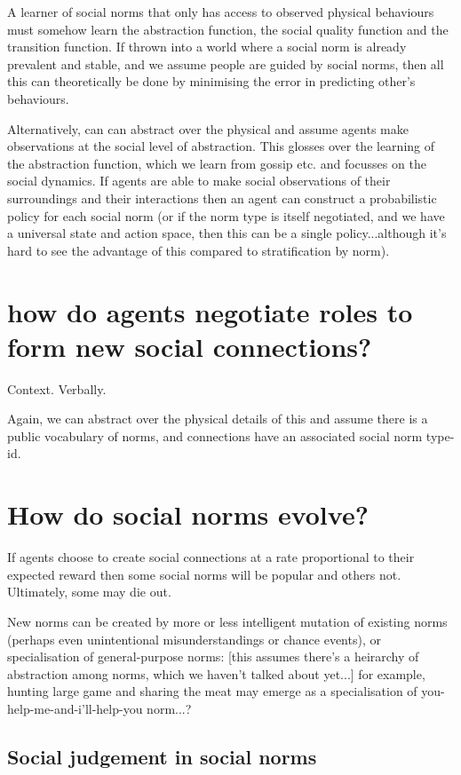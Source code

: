 \documentclass[a4paper]{article}
\begin{document}
A learner of social norms that only has access to observed physical behaviours must somehow learn the abstraction function, the social quality function and the transition function. If thrown into a world where a social norm is already prevalent and stable, and we assume people are guided by social norms, then all this can theoretically be done by minimising the error in predicting other's behaviours.

Alternatively, can can abstract over the physical and assume agents make observations at the social level of abstraction. This glosses over the learning of the abstraction function, which we learn from gossip etc. and focusses on the social dynamics. If agents are able to make social observations of their surroundings and their interactions then an agent can construct a probabilistic policy for each social norm (or if the norm type is itself negotiated, and we have a universal state and action space, then this can be a single policy...although it's hard to see the advantage of this compared to stratification by norm).


\section{how do agents negotiate roles to form new social connections?}
Context. Verbally.

Again, we can abstract over the physical details of this and assume there is a public vocabulary of norms, and connections have an associated social norm type-id.

\section{How do social norms evolve?}

If agents choose to create social connections at a rate proportional to their expected reward then some social norms will be popular and others not. Ultimately, some may die out.

New norms can be created by more or less intelligent mutation of existing norms (perhaps even unintentional misunderstandings or chance events), or specialisation of general-purpose norms: [this assumes there's a heirarchy of abstraction among norms, which we haven't talked about yet...] for example, hunting large game and sharing the meat may emerge as a specialisation of you-help-me-and-i'll-help-you norm...?

\subsection{Social judgement in social norms}
\end{document}
